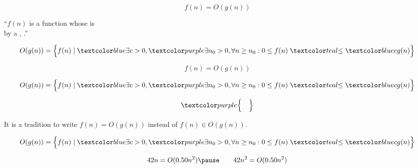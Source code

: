 \begin{frame}{}
  \begin{center}
    \[
      \boxed{f(n) = O(g(n))}
    \]

    \pause
    ``$f(n)$ is a function whose  is  \\
    by a , .''
    \pause
    \vspace{0.30cm}

    \pause
    \vspace{-0.50cm}
    \[
        O(g(n)) = \Big\{f(n) \mid \blue{\exists c > 0}, 
        \purple{\exists n_0 > 0, \forall n \ge n_0}: 
        0 \le f(n) \;\teal{\le}\; \blue{c g(n)} \Big\}
    \]
  \end{center}
\end{frame}

\begin{frame}{}
  \[
   \boxed{f(n) = O(g(n))}
  \]

  \[
      O(g(n)) = \Big\{f(n) \mid \blue{\exists c > 0}, 
      \purple{\exists n_0 > 0, \forall n \ge n_0}: 
      0 \le f(n) \;\teal{\le}\; \blue{c g(n)} \Big\}
  \]

  \pause
  \[
	\purple{\Big\{ \quad \Big\}}
  \]

  \pause
  \begin{center}
    It is a tradition to write $f(n) = O(g(n))$ instead of $f(n) \in O(g(n))$.
  \end{center}
\end{frame}

\begin{frame}{}
  \[
      O(g(n)) = \Big\{f(n) \mid \blue{\exists c > 0}, 
      \purple{\exists n_0 > 0, \forall n \ge n_0}: 
      0 \le f(n) \;\teal{\le}\; \blue{c g(n)} \Big\}
  \]

  \pause
  \[
    42n = O(0.50 n^2) \pause \qquad 42n^2 = O(0.50 n^2)
  \]

  \pause
  \begin{center}
     \\[15pt]
  \end{center}
\end{frame}

